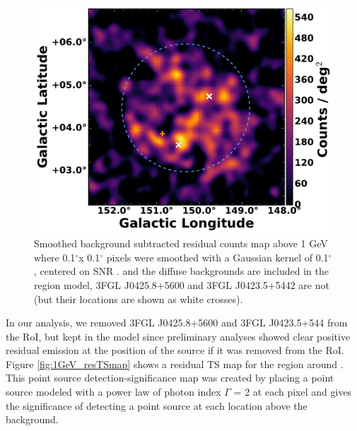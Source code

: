 \begin{figure}[!ht]
	\begin{centering}
		\includegraphics[width=1.\columnwidth]{Figures/G150/G150_1GeV_source_w3FGL_noLabs.pdf}
		\caption[Smoothed background subtracted residual counts map above 1 GeV for \Gone{}]{Smoothed background subtracted residual counts map above 1 GeV where 0.1$^\circ$x 0.1$^\circ$ pixels were smoothed with a Gaussian kernel of 0.1$^\circ$, centered on SNR \Gone. \psrLike{} and the diffuse backgrounds are included in the region model, 3FGL J0425.8+5600 and 3FGL J0423.5+5442 are not (but their locations are shown as white crosses). %
			\label{fig:1GeV_cmaps}}
	\end{centering}
\end{figure}

In our analysis, we removed 3FGL J0425.8+5600 and 3FGL J0423.5+544 from the RoI, but kept \psrLike{} in the model since preliminary analyses showed clear positive residual emission at the position of the source if it was removed from the RoI. Figure \ref{fig:1GeV_resTSmap} shows a residual TS map for the region around \Gone. This point source detection-significance map was created by placing a point source modeled with a power law of photon index $\Gamma$ = 2  at each pixel and gives the significance of detecting a point source at each location above the background. 

